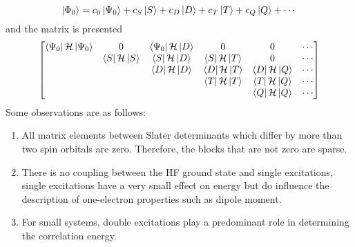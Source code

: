 \documentclass[11pt]{article}
\begin{document}
\begin{equation}
    \ket{\Phi_0}=c_0\ket{\Psi_0}+c_S\ket{S}+c_D\ket{D}+c_T\ket{T}+c_Q\ket{Q}+\cdots
\end{equation}
and the matrix is presented
\begin{equation}
    \begin{bmatrix}
        \bra{\Psi_0}\mathcal{H}\ket{\Psi_0}&0&\bra{\Psi_0}\mathcal{H}\ket{D}&0&0&\cdots\\
        \quad&\bra{S}\mathcal{H}\ket{S}&\bra{S}\mathcal{H}\ket{D}&\bra{S}\mathcal{H}\ket{T}&0&\cdots\\
        \quad&\quad&\bra{D}\mathcal{H}\ket{D}&\bra{D}\mathcal{H}\ket{T}&\bra{D}\mathcal{H}\ket{Q}&\cdots\\
        \quad&\quad&\quad&\bra{T}\mathcal{H}\ket{T}&\bra{T}\mathcal{H}\ket{Q}&\cdots\\
        \quad&\quad&\quad&\quad&\bra{Q}\mathcal{H}\ket{Q}&\cdots
    \end{bmatrix}
\end{equation}
Some observations are as follows:
\begin{enumerate}
    \item All matrix elements between Slater determinants which differ by more than two spin orbitals are zero. Therefore, the blocks
          that are not zero are sparse.
    \item There is no coupling between the HF ground state and single excitations, single excitations have a very small effect on energy
          but do influence the description of one-electron properties such as dipole moment.
    \item For small systems, double excitations play a predominant role in determining the correlation energy.
\end{enumerate}
\end{document}
